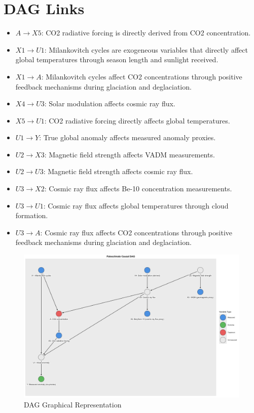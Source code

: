 \documentclass{article}
\begin{document}
\section*{DAG Links}
\begin{itemize}
    \item $A \to X5$: CO2 radiative forcing is directly derived from CO2 concentration.
    \item $X1 \to U1$: Milankovitch cycles are exogeneous variables that directly affect global temperatures through season length and sunlight received.
    \item $X1 \to A$: Milankovitch cycles affect CO2 concentrations through positive feedback mechanisms during glaciation and deglaciation.
    \item $X4 \to U3$: Solar modulation affects cosmic ray flux.
    \item $X5 \to U1$: CO2 radiative forcing directly affects global temperatures.
    \item $U1 \to Y$: True global anomaly affects measured anomaly proxies.
    \item $U2 \to X3$: Magnetic field strength affects VADM measurements.
    \item $U2 \to U3$: Magnetic field strength affects cosmic ray flux.
    \item $U3 \to X2$: Cosmic ray flux affects Be-10 concentration measurements.
    \item $U3 \to U1$: Cosmic ray flux affects global temperatures through cloud formation.
    \item $U3 \to A$: Cosmic ray flux affects CO2 concentrations through positive feedback mechanisms during glaciation and deglaciation.
\end{itemize}

\begin{figure}[!ht]
    \centering
    \includegraphics[width=500px]{../Outputs/Paleoclimate_Causal_DAG.png}
    \caption{DAG Graphical Representation}
\end{figure}
\end{document}
